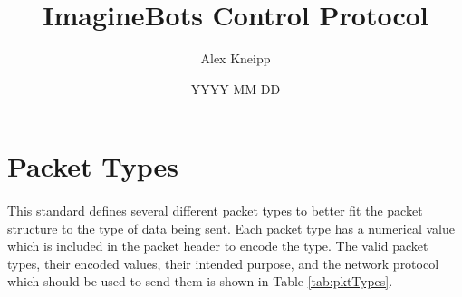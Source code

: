 \documentclass[11pt]{article}
\begin{document}

\title{ImagineBots Control Protocol}
\author{Alex Kneipp}
\date{YYYY-MM-DD}
\maketitle

\hspace{1in}

\tableofcontents


\newpage
\section {Packet Types}
\paragraph{}
This standard defines several different packet types to better fit the packet structure to the type of data being sent.
Each packet type has a numerical value which is included in the packet header to encode the type.
The valid packet types, their encoded values, their intended purpose, 
and the network protocol which should be used to send them is shown in Table \ref{tab:pktTypes}.
\end{document}
